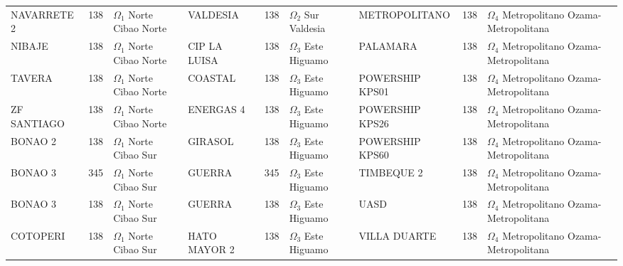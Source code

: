 \begin{table}[!p]
{{\begin{tabular}{@{}lrl@{\hspace{3.5pt}}|@{\hspace{3.5pt}}lrl@{\hspace{3.5pt}}|@{\hspace{3.5pt}}lrl@{}}
NAVARRETE 2 & 138 & \makecell[l]{$\Omega_1$ Norte\\Cibao Norte} & VALDESIA & 138 & \makecell[l]{$\Omega_2$ Sur\\Valdesia} & METROPOLITANO & 138 & \makecell[l]{$\Omega_4$ Metropolitano\\Ozama-Metropolitana} \\
NIBAJE & 138 & \makecell[l]{$\Omega_1$ Norte\\Cibao Norte} & CIP LA LUISA & 138 & \makecell[l]{$\Omega_3$ Este\\Higuamo} & PALAMARA & 138 & \makecell[l]{$\Omega_4$ Metropolitano\\Ozama-Metropolitana} \\
TAVERA & 138 & \makecell[l]{$\Omega_1$ Norte\\Cibao Norte} & COASTAL & 138 & \makecell[l]{$\Omega_3$ Este\\Higuamo} & POWERSHIP KPS01 & 138 & \makecell[l]{$\Omega_4$ Metropolitano\\Ozama-Metropolitana} \\
ZF SANTIAGO & 138 & \makecell[l]{$\Omega_1$ Norte\\Cibao Norte} & ENERGAS 4 & 138 & \makecell[l]{$\Omega_3$ Este\\Higuamo} & POWERSHIP KPS26 & 138 & \makecell[l]{$\Omega_4$ Metropolitano\\Ozama-Metropolitana} \\
BONAO 2 & 138 & \makecell[l]{$\Omega_1$ Norte\\Cibao Sur} & GIRASOL & 138 & \makecell[l]{$\Omega_3$ Este\\Higuamo} & POWERSHIP KPS60 & 138 & \makecell[l]{$\Omega_4$ Metropolitano\\Ozama-Metropolitana} \\
BONAO 3 & 345 & \makecell[l]{$\Omega_1$ Norte\\Cibao Sur} & GUERRA & 345 & \makecell[l]{$\Omega_3$ Este\\Higuamo} & TIMBEQUE 2 & 138 & \makecell[l]{$\Omega_4$ Metropolitano\\Ozama-Metropolitana} \\
BONAO 3 & 138 & \makecell[l]{$\Omega_1$ Norte\\Cibao Sur} & GUERRA & 138 & \makecell[l]{$\Omega_3$ Este\\Higuamo} & UASD & 138 & \makecell[l]{$\Omega_4$ Metropolitano\\Ozama-Metropolitana} \\
COTOPERI & 138 & \makecell[l]{$\Omega_1$ Norte\\Cibao Sur} & HATO MAYOR 2 & 138 & \makecell[l]{$\Omega_3$ Este\\Higuamo} & VILLA DUARTE & 138 & \makecell[l]{$\Omega_4$ Metropolitano\\Ozama-Metropolitana} \\

\end{tabular}}}
\end{table}

